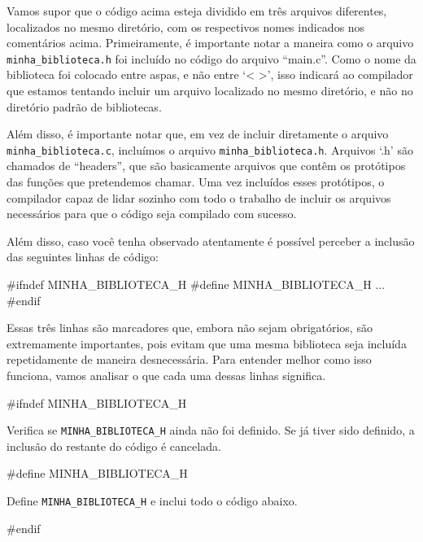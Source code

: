 Vamos supor que o código acima esteja dividido em três arquivos diferentes, 
localizados no mesmo diretório, com os respectivos nomes indicados nos 
comentários acima. Primeiramente, é importante notar a maneira como o arquivo 
\texttt{minha\_biblioteca.h} foi incluído no código do arquivo ``main.c''. 
Como o nome da biblioteca foi colocado entre aspas, e não entre `\textless 
\textgreater', isso indicará ao compilador que estamos tentando incluir um 
arquivo localizado no mesmo diretório, e não no diretório padrão de bibliotecas.

Além disso, é importante notar que, em vez de incluir diretamente o arquivo 
\texttt{minha\_biblioteca.c}, incluímos o arquivo \texttt{minha\_biblioteca.h}. 
Arquivos `.h' são chamados de ``headers'', que são basicamente arquivos que 
contêm os protótipos das funções que pretendemos chamar. Uma vez incluídos 
esses protótipos, o compilador capaz de lidar sozinho com todo o trabalho de 
incluir os arquivos necessários para que o código seja compilado com sucesso.

Além disso, caso você tenha observado atentamente é possível perceber a 
inclusão das seguintes linhas de código:

\newpage
\begin{excode}
    #ifndef MINHA_BIBLIOTECA_H
    #define MINHA_BIBLIOTECA_H
    ...
    #endif
\end{excode}

Essas três linhas são marcadores que, embora não sejam obrigatórios, são 
extremamente importantes, pois evitam que uma mesma biblioteca seja incluída 
repetidamente de maneira desnecessária. Para entender melhor como isso 
funciona, vamos analisar o que cada uma dessas linhas significa.

\begin{excode}
    #ifndef MINHA_BIBLIOTECA_H
\end{excode}

Verifica se \texttt{MINHA\_BIBLIOTECA\_H} ainda não foi definido. Se já tiver sido definido, a inclusão do restante do código é cancelada.

\begin{excode}
    #define MINHA_BIBLIOTECA_H
\end{excode}

Define \texttt{MINHA\_BIBLIOTECA\_H} e inclui todo o código abaixo.

\begin{excode}
    #endif
\end{excode}

